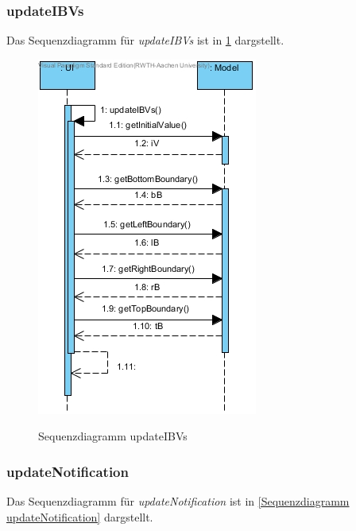 \subsubsection*{updateIBVs}

Das Sequenzdiagramm für \emph{updateIBVs} ist in \ref{Sequenzdiagramm updateIBVs} dargstellt.

\begin{figure}[H]
	\centering
	\includegraphics[scale=.6]{Bilder/UI__updateIBVs().jpg}\\
	\caption{Sequenzdiagramm updateIBVs}
	\label{Sequenzdiagramm updateIBVs}
\end{figure}

\subsubsection*{updateNotification}

Das Sequenzdiagramm für \emph{updateNotification} ist in \ref{Sequenzdiagramm updateNotification} dargstellt.

